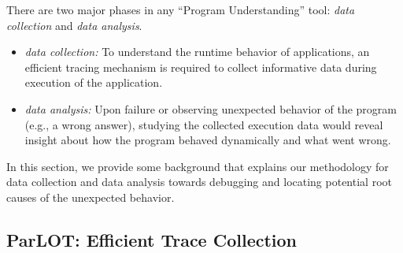 
There are two major phases in any ``Program Understanding'' tool: \textit{data collection} and \textit{data analysis}.
%
\begin{itemize}
	\item \textit{data collection:} To understand the runtime behavior of applications, an efficient tracing mechanism is required to collect informative data during execution of the application.
	\item \textit{data analysis:} Upon failure or observing unexpected behavior of the program (e.g., a wrong answer), studying the collected execution data would reveal insight about how the program behaved dynamically and what went wrong.
\end{itemize}



In this section, we provide some background that explains our methodology for data collection and data analysis towards debugging and locating potential root causes of the unexpected behavior. 
%

\subsection{ParLOT: Efficient Trace Collection}
\label{subsec:parlot}


